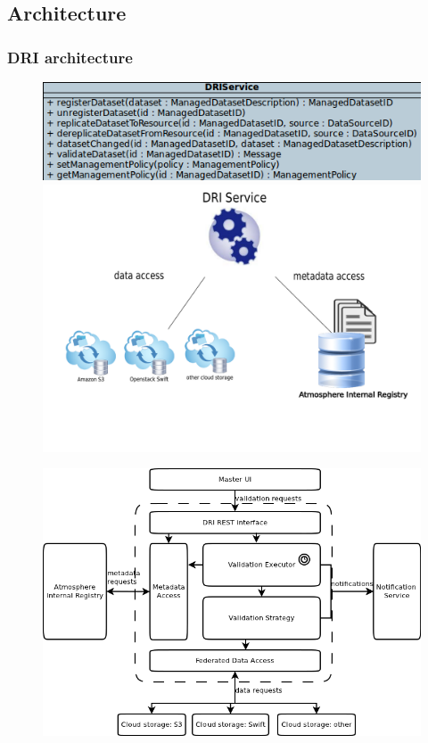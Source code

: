 \documentclass[compress]{beamer}
\begin{document}
\subsection{Architecture}
\begin{frame}
\frametitle{\textbf{DRI architecture}}
\begin{figure}
	\centering
	\includegraphics[height=0.3\textheight]{img/dri_interface.png}\\
	\includegraphics[height=0.7\textheight]{img/schemat.pdf}
\end{figure}
\end{frame}

\begin{frame}
\begin{figure}
	\centering
	\includegraphics[height=0.8\textheight]{img/design.png}
\end{figure}
\end{frame}
\end{document}
